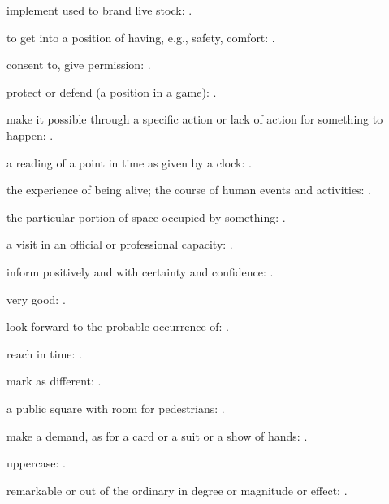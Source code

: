   implement used to brand live stock:   .

  to get into a position of having, e.g., safety, comfort: .

  consent to, give permission:   .

  protect or defend (a position in a game): .

  make it possible through a specific action or lack of action for something to happen:   .

  a reading of a point in time as given by a clock:   .

  the experience of being alive; the course of human events and activities:   .

  the particular portion of space occupied by something:   .

  a visit in an official or professional capacity: .

  inform positively and with certainty and confidence:   .

  very good:   .

  look forward to the probable occurrence of:   .

  reach in time: .

  mark as different:   .

  a public square with room for pedestrians:   .

  make a demand, as for a card or a suit or a show of hands:   .

  uppercase:   .

  remarkable or out of the ordinary in degree or magnitude or effect: .

